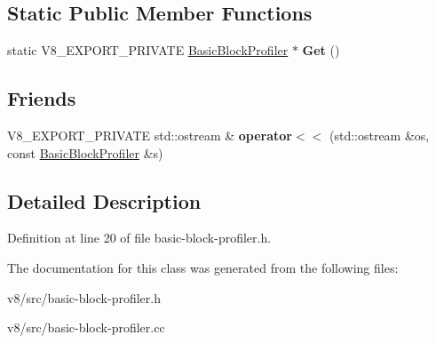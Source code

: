 \subsection*{Static Public Member Functions}
\begin{DoxyCompactItemize}
\item 
\mbox{\label{classv8_1_1internal_1_1BasicBlockProfiler_a485da5db959d224a099ae4632758164e}} 
static V8\+\_\+\+E\+X\+P\+O\+R\+T\+\_\+\+P\+R\+I\+V\+A\+TE \mbox{\hyperlink{classv8_1_1internal_1_1BasicBlockProfiler}{Basic\+Block\+Profiler}} $\ast$ {\bfseries Get} ()
\end{DoxyCompactItemize}
\subsection*{Friends}
\begin{DoxyCompactItemize}
\item 
\mbox{\label{classv8_1_1internal_1_1BasicBlockProfiler_a15ade411bc5ef660fe5395d68cfd0ee6}} 
V8\+\_\+\+E\+X\+P\+O\+R\+T\+\_\+\+P\+R\+I\+V\+A\+TE std\+::ostream \& {\bfseries operator$<$$<$} (std\+::ostream \&os, const \mbox{\hyperlink{classv8_1_1internal_1_1BasicBlockProfiler}{Basic\+Block\+Profiler}} \&s)
\end{DoxyCompactItemize}


\subsection{Detailed Description}


Definition at line 20 of file basic-\/block-\/profiler.\+h.



The documentation for this class was generated from the following files\+:\begin{DoxyCompactItemize}
\item 
v8/src/basic-\/block-\/profiler.\+h\item 
v8/src/basic-\/block-\/profiler.\+cc\end{DoxyCompactItemize}
